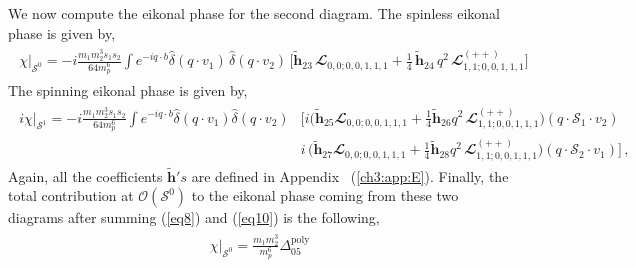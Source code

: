 We now compute the eikonal phase for the second diagram.
The spinless eikonal phase is given by,
\begin{align}
    \begin{split} \label{eq10}
        \chi\Big|_{\mathcal{S}^0} =-i\frac{m_1 m_2^3 s_1 s_2}{64 m_p^6} \int e^{-iq\cdot b}\hat\delta(q\cdot v_1)\,\hat\delta(q\cdot v_2)\,\Bigg[\boldsymbol{\tilde h}_{23} \,\mathbfcal{L}_{0,0;0,0,1,1,1}+\frac{1}{4}\,\boldsymbol{\tilde h}_{24}\,q^2\,\mathbfcal{L}^{(++)}_{1,1;0,0,1,1,1}\Bigg]
    \end{split}
\end{align}
The spinning eikonal phase is given by,
\begin{align}
    \begin{split} \label{eq11}
        i\chi\Big|_{\mathcal{S}^1} =-i\frac{m_1 m_2^3 s_1 s_2}{64 m_p^6}\int e^{-iq\cdot b}\hat\delta(q\cdot v_1)\hat\delta(q\cdot v_2)&\Bigg[i\Bigg( \boldsymbol{\tilde h}_{25}\mathbfcal{L}_{0,0;0,0,1,1,1}+\frac{1}{4}\boldsymbol{\tilde h}_{26}q^2\,\mathbfcal{L}^{(++)}_{1,1;0,0,1,1,1}\Bigg)(q\cdot \mathcal{S}_1\cdot v_2)\\&i\,\Bigg( \boldsymbol{\tilde h}_{27}\mathbfcal{L}_{0,0;0,0,1,1,1}+\frac{1}{4}\boldsymbol{\tilde h}_{28}q^2\,\mathbfcal{L}^{(++)}_{1,1;0,0,1,1,1}\Bigg)(q\cdot \mathcal{S}_2\cdot v_1)\Bigg]\,,
    \end{split}
\end{align}
Again, all the coefficients $\boldsymbol{\tilde h}'s$ are defined in Appendix ~(\ref{ch3:app:E}).
Finally, the total contribution at $\mathcal{O}(\mathcal{S}^0)$ to the eikonal phase coming from these two diagrams after summing (\ref{eq8}) and (\ref{eq10}) is the following, 
\begin{align}
    \begin{split}  \label{eqt4}
     \chi\Big|_{\mathcal{S}^0}=\frac{m_1m_2^3}{m_p^6}\Delta_{\mathfrak{05}}^{\textrm{poly}}
     \end{split}
\end{align}
